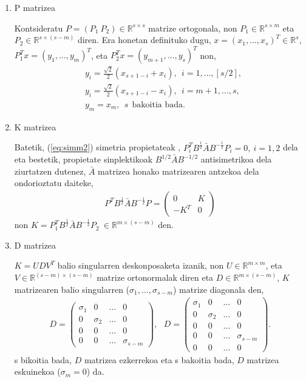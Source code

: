 \begin{enumerate}
\item P matrizea

Kontsideratu $P=(P_1 \ P_2) \in \mathbb{R}^{s \times s}$ matrize ortogonala, non $P_1 \in \mathbb{R}^{s \times m}$ eta $P_2 \in \mathbb{R}^{s \times (s-m)}$ diren. Era honetan definituko dugu,  $x=(x_1,\dots,x_s)^T \in \mathbb{R}^s$, $P_1^Tx=(y_1,\dots,y_m)^T$, eta $P_2^Tx=(y_{m+1},\dots,y_s)^T$ non,
\begin{align*}
&y_i = \frac{\sqrt{2}}{2} (x_{s+1-i}+x_i), \ \ i=1,\dots,[s/2], \\
&y_i =\frac{\sqrt{2}}{2} (x_{s+1-i}-x_{i}), \ \ i=m+1,\dots,s, \\
&y_{m} = x_{m}, \ \ s \ \ \mbox{bakoitia bada}.
\end{align*}  

\item K matrizea

Batetik, (\ref{eq:simm2}) simetria propietateak ,  $P_i^TB^{\frac{1}{2}}\bar{A}B^{-\frac{1}{2}}P_i=0, \ i=1,2$ dela eta bestetik, propietate sinplektikoak $B^{1/2}\bar{A}B^{-1/2}$ antisimetrikoa dela ziurtatzen dutenez, $\bar{A}$ matrizea honako matrizearen antzekoa dela ondorioztatu daiteke,
\begin{align}
P^TB^{\frac{1}{2}}\bar{A}B^{-\frac{1}{2}}P=
\left(
\begin{matrix}
0 & K \\
-K^T & 0
\end{matrix}
\right)
\end{align}
non $K=P_1^TB^{\frac{1}{2}}\bar{A}B^{-\frac{1}{2}}P_2 \ \in \mathbb{R}^{m \times (s-m)}$ den.

\item D matrizea

$K=UDV^T$ balio singularren deskonposaketa izanik, non $U \in \mathbb{R}^{m \times m}$, eta $V \in \mathbb{R}^{(s-m) \times (s-m)}$ matrize ortonormalak diren eta $D \in \mathbb{R}^{m \times (s-m)}$, $K$ matrizearen balio singularren ($\sigma_1, \dots, \sigma_{s-m}$) matrize diagonala den,
\begin{align}
\label{eq:Dmat}
D=
\left(
\begin{matrix}
\sigma_1 & 0 & \dots & 0 \\
0 & \sigma_2 & \dots & 0 \\
0 & 0 & \dots & 0 \\
0 & 0 & \dots & \sigma_{s-m}
\end{matrix}
\right), \ \ \
D=
\left(
\begin{matrix}
\sigma_1 & 0 & \dots & 0 \\
0 & \sigma_2 & \dots & 0 \\
0 & 0 & \dots & 0 \\
0 & 0 & \dots & \sigma_{s-m} \\
0 & 0 & \dots & 0
\end{matrix}
\right).
\end{align}
s bikoitia bada, $D$ matrizea ezkerrekoa eta s bakoitia bada, $D$ matrizea eskuinekoa ($\sigma_m=0$) da. 


\end{enumerate}
